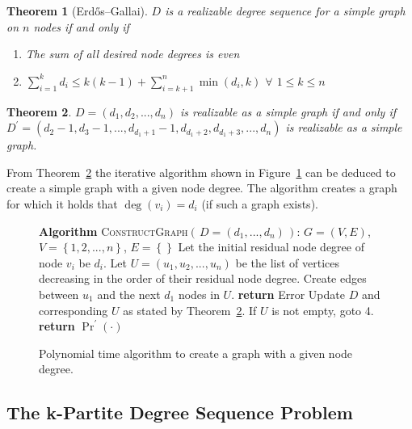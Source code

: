 \documentclass[journal,10pt]{IEEEtran}
\newtheorem{theorem}{Theorem}
\begin{document}
		\begin{theorem}[Erdős–Gallai]
			$D$ is a realizable degree sequence for a simple graph on $n$ nodes if and only if
			\begin{enumerate}
				\item The sum of all desired node degrees is even
				\item $\sum_{i=1}^k d_i \leq k(k-1) + \sum_{i=k+1}^n \min(d_i, k)$ $\forall$ $1 \leq k \leq n$
			\end{enumerate}
			\label{theo:1}
		\end{theorem}

		\begin{theorem}
		$D = (d_1, d_2, ..., d_n)$ is realizable as a simple graph if and only if $D^\prime = (d_2-1, d_3-1, ..., d_{d_1+1}-1, d_{d_1+2}, d_{d_1+3}, ..., d_n)$
		is realizable as a simple graph.\\
			\label{theo:2}
		\end{theorem}

		
		
		From Theorem~\ref{theo:2} the iterative algorithm shown in Figure~\ref{algo:1} can be deduced to create a simple graph with a given node degree.
		The algorithm creates a graph for which it holds that $\deg(v_i) = d_i$ (if such a graph exists).
			



\begin{figure}
\begin{algorithmic}[1]
	\State \textbf{Algorithm} \textsc{ConstructGraph}$\left(\, D = (d_1, ...,d_n) \,\right)$:
	\State $G = (V,E)$, $V = \left\lbrace 1, 2, ..., n \right\rbrace $, $E = \left\lbrace \right\rbrace $
	\State Let the initial residual node degree of node $v_i$ be $d_i$.
	\State Let $U = (u_1, u_2, ..., u_n)$ be the list of vertices decreasing in the order of their residual node degree.
	\State Create edges between $u_1$ and the next $d_1$ nodes in $U$.
		\State \textbf{return} Error
	\EndIf
	\State Update $D$ and corresponding $U$ as stated by Theorem~\ref{theo:2}.
	\State If $U$ is not empty, goto 4.
	\State \textbf{return} $\Pr^\prime(\cdot)$
\end{algorithmic}
	\caption{Polynomial time algorithm to create a graph with a given node degree.}
	\label{algo:1}
\end{figure}
		
		
		
		
		
	\subsection{The k-Partite Degree Sequence Problem}
\end{document}
